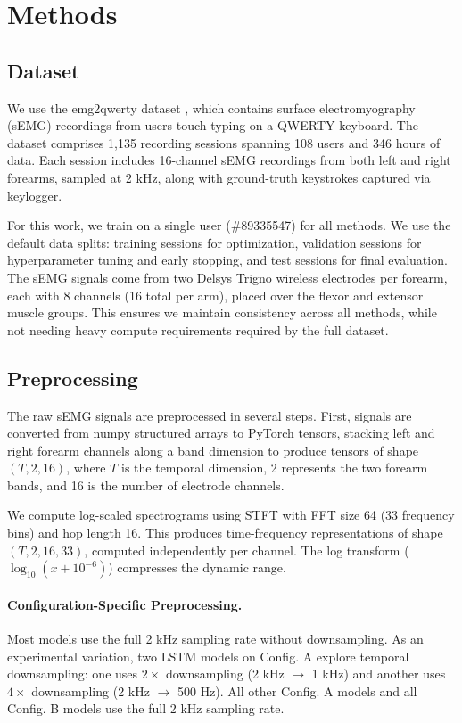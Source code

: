 \documentclass{article}
\begin{document}
\section{Methods}

\subsection{Dataset}

We use the emg2qwerty dataset \citep{sivakumar2024emg2qwertylargedatasetbaselines}, which contains surface electromyography (sEMG) recordings from users touch typing on a QWERTY keyboard. The dataset comprises 1,135 recording sessions spanning 108 users and 346 hours of data. Each session includes 16-channel sEMG recordings from both left and right forearms, sampled at 2 kHz, along with ground-truth keystrokes captured via keylogger.

For this work, we train on a single user (\#89335547) for all methods. We use the default data splits: training sessions for optimization, validation sessions for hyperparameter tuning and early stopping, and test sessions for final evaluation. The sEMG signals come from two Delsys Trigno wireless electrodes per forearm, each with 8 channels (16 total per arm), placed over the flexor and extensor muscle groups. This ensures we maintain consistency across all methods, while not needing heavy compute requirements required by the full dataset.

\subsection{Preprocessing}

The raw sEMG signals are preprocessed in several steps. First, signals are converted from numpy structured arrays to PyTorch tensors, stacking left and right forearm channels along a band dimension to produce tensors of shape $(T, 2, 16)$, where $T$ is the temporal dimension, 2 represents the two forearm bands, and 16 is the number of electrode channels.

We compute log-scaled spectrograms using STFT with FFT size 64 (33 frequency bins) and hop length 16. This produces time-frequency representations of shape $(T, 2, 16, 33)$, computed independently per channel. The log transform ($\log_{10}(x + 10^{-6})$) compresses the dynamic range.

\paragraph{Configuration-Specific Preprocessing.} Most models use the full 2 kHz sampling rate without downsampling. As an experimental variation, two LSTM models on Config. A explore temporal downsampling: one uses $2\times$ downsampling (2 kHz $\to$ 1 kHz) and another uses $4\times$ downsampling (2 kHz $\to$ 500 Hz). All other Config. A models and all Config. B models use the full 2 kHz sampling rate.
\end{document}
